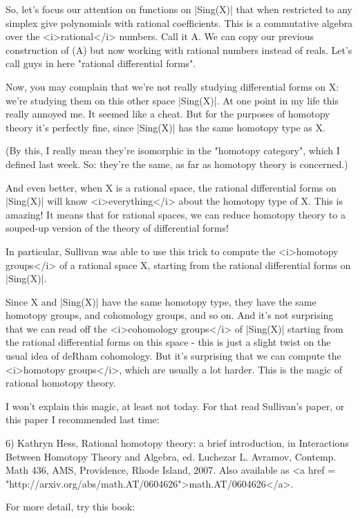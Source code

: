 So, let's focus our attention on functions on |Sing(X)| that when
restricted to any simplex give polynomials with rational coefficients.
This is a commutative algebra over the <i>rational</i> numbers.  Call it A.
We can copy our previous construction of \Omega (A) but now working with 
rational numbers instead of reals.  Let's call guys in here "rational 
differential forms".

Now, you may complain that we're not really studying differential
forms on X: we're studying them on this other space |Sing(X)|.  At one
point in my life this really annoyed me.  It seemed like a cheat.  But
for the purposes of homotopy theory it's perfectly fine, since
|Sing(X)| has the same homotopy type as X.  

(By this, I really mean they're isomorphic in the "homotopy
category", which I defined last week.  So: they're the
same, as far as homotopy theory is concerned.)

And even better, when X is a rational space, the rational differential
forms on |Sing(X)| will know <i>everything</i> about the homotopy type of
X.  This is amazing!  It means that for rational spaces, we can reduce
homotopy theory to a souped-up version of the theory of differential
forms!

In particular, Sullivan was able to use this trick to compute 
the <i>homotopy groups</i> of a rational space X, starting from the
rational differential forms on |Sing(X)|.  

Since X and |Sing(X)| have the same homotopy type, they have the same
homotopy groups, and cohomology groups, and so on.  And it's not
surprising that we can read off the <i>cohomology groups</i> of
|Sing(X)| starting from the rational differential forms on this space
- this is just a slight twist on the usual idea of deRham cohomology.
But it's surprising that we can compute the <i>homotopy groups</i>, which
are usually a lot harder.  This is the magic of rational homotopy
theory.  

I won't explain this magic, at least not today.  For that read
Sullivan's paper, or this paper I recommended last time:

6) Kathryn Hess, Rational homotopy theory: a brief introduction,
in Interactions Between Homotopy Theory and Algebra, ed. 
Luchezar L. Avramov, Contemp. Math 436, AMS, Providence, Rhode
Island, 2007.   Also available as <a href = "http://arxiv.org/abs/math.AT/0604626">math.AT/0604626</a>.

For more detail, try this book:


